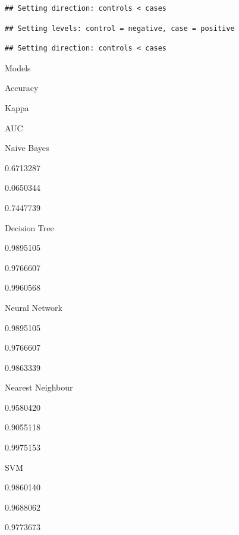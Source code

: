 \documentclass[
]{article}
\begin{document}
\begin{verbatim}
## Setting direction: controls < cases
\end{verbatim}

\begin{verbatim}
## Setting levels: control = negative, case = positive
\end{verbatim}

\begin{verbatim}
## Setting direction: controls < cases
\end{verbatim}

Models

Accuracy

Kappa

AUC

Naive Bayes

0.6713287

0.0650344

0.7447739

Decision Tree

0.9895105

0.9766607

0.9960568

Neural Network

0.9895105

0.9766607

0.9863339

Nearest Neighbour

0.9580420

0.9055118

0.9975153

SVM

0.9860140

0.9688062

0.9773673
\end{document}

